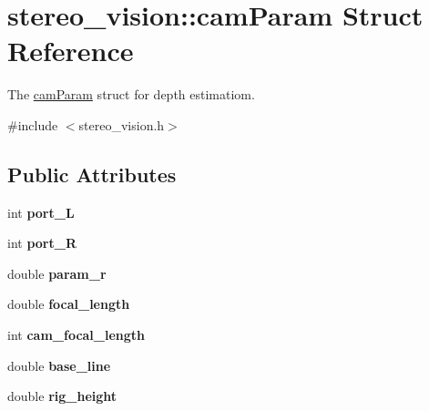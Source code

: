 \hypertarget{structstereo__vision_1_1cam_param}{}\section{stereo\+\_\+vision\+:\+:cam\+Param Struct Reference}
\label{structstereo__vision_1_1cam_param}


The \hyperlink{structstereo__vision_1_1cam_param}{cam\+Param} struct for depth estimatiom.  




{\ttfamily \#include $<$stereo\+\_\+vision.\+h$>$}

\subsection*{Public Attributes}
\begin{DoxyCompactItemize}
\item 
\hypertarget{structstereo__vision_1_1cam_param_ab5a239a0dbe3c7079ef18dcb45e1b6ca}{}int {\bfseries port\+\_\+\+L}\label{structstereo__vision_1_1cam_param_ab5a239a0dbe3c7079ef18dcb45e1b6ca}

\item 
\hypertarget{structstereo__vision_1_1cam_param_a8eb191e3eca2630aa82358393083dbe5}{}int {\bfseries port\+\_\+\+R}\label{structstereo__vision_1_1cam_param_a8eb191e3eca2630aa82358393083dbe5}

\item 
\hypertarget{structstereo__vision_1_1cam_param_ab16a090f63e05103059167e0fca24b8a}{}double {\bfseries param\+\_\+r}\label{structstereo__vision_1_1cam_param_ab16a090f63e05103059167e0fca24b8a}

\item 
\hypertarget{structstereo__vision_1_1cam_param_a7bb87f80c0820de75fce40c563103205}{}double {\bfseries focal\+\_\+length}\label{structstereo__vision_1_1cam_param_a7bb87f80c0820de75fce40c563103205}

\item 
\hypertarget{structstereo__vision_1_1cam_param_ac19c2db648f2cb730009f12b145e7aa0}{}int {\bfseries cam\+\_\+focal\+\_\+length}\label{structstereo__vision_1_1cam_param_ac19c2db648f2cb730009f12b145e7aa0}

\item 
\hypertarget{structstereo__vision_1_1cam_param_a4583737f3ea1fde8f47a42e85b96bb98}{}double {\bfseries base\+\_\+line}\label{structstereo__vision_1_1cam_param_a4583737f3ea1fde8f47a42e85b96bb98}

\item 
\hypertarget{structstereo__vision_1_1cam_param_ad7f49fa94e95033ca85828fc788ba7f1}{}double {\bfseries rig\+\_\+height}\label{structstereo__vision_1_1cam_param_ad7f49fa94e95033ca85828fc788ba7f1}

\end{DoxyCompactItemize}


